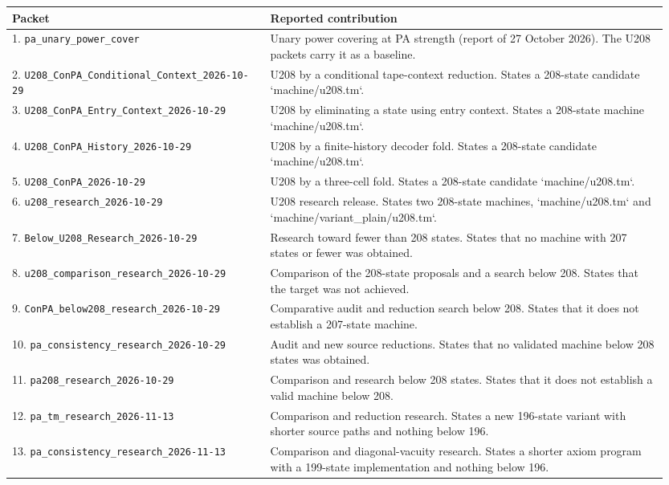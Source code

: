 \small
\begin{longtable}{@{}p{0.37\linewidth}p{0.58\linewidth}@{}}
\toprule Packet & Reported contribution\\\midrule\endhead
1. \nolinkurl{pa_unary_power_cover} & Unary power covering at PA strength (report of 27 October 2026). The U208 packets carry it as a baseline.\\[5pt]
2. \nolinkurl{U208_ConPA_Conditional_Context_2026-10-29} & U208 by a conditional tape-context reduction. States a 208-state candidate `machine/u208.tm`.\\[5pt]
3. \nolinkurl{U208_ConPA_Entry_Context_2026-10-29} & U208 by eliminating a state using entry context. States a 208-state machine `machine/u208.tm`.\\[5pt]
4. \nolinkurl{U208_ConPA_History_2026-10-29} & U208 by a finite-history decoder fold. States a 208-state candidate `machine/u208.tm`.\\[5pt]
5. \nolinkurl{U208_ConPA_2026-10-29} & U208 by a three-cell fold. States a 208-state candidate `machine/u208.tm`.\\[5pt]
6. \nolinkurl{u208_research_2026-10-29} & U208 research release. States two 208-state machines, `machine/u208.tm` and `machine/variant\_plain/u208.tm`.\\[5pt]
7. \nolinkurl{Below_U208_Research_2026-10-29} & Research toward fewer than 208 states. States that no machine with 207 states or fewer was obtained.\\[5pt]
8. \nolinkurl{u208_comparison_research_2026-10-29} & Comparison of the 208-state proposals and a search below 208. States that the target was not achieved.\\[5pt]
9. \nolinkurl{ConPA_below208_research_2026-10-29} & Comparative audit and reduction search below 208. States that it does not establish a 207-state machine.\\[5pt]
10. \nolinkurl{pa_consistency_research_2026-10-29} & Audit and new source reductions. States that no validated machine below 208 states was obtained.\\[5pt]
11. \nolinkurl{pa208_research_2026-10-29} & Comparison and research below 208 states. States that it does not establish a valid machine below 208.\\[5pt]
12. \nolinkurl{pa_tm_research_2026-11-13} & Comparison and reduction research. States a new 196-state variant with shorter source paths and nothing below 196.\\[5pt]
13. \nolinkurl{pa_consistency_research_2026-11-13} & Comparison and diagonal-vacuity research. States a shorter axiom program with a 199-state implementation and nothing below 196.\\[5pt]

\end{longtable}
